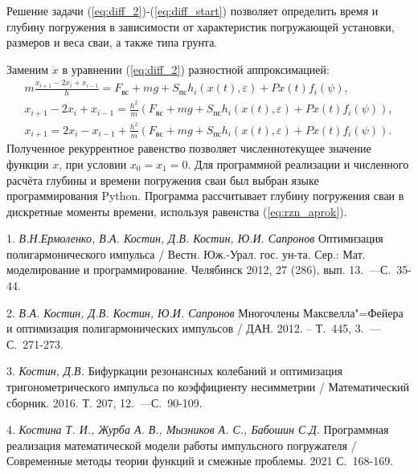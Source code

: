 Решение задачи (\ref{eq:diff_2})-(\ref{eq:diff_start}) позволяет определить время и глубину погружения в зависимости от характеристик погружающей установки, размеров и веса сваи, а также типа грунта.

Заменим $\ddot{x}$ в уравнении (\ref{eq:diff_2}) разностной аппроксимацией:
\begin{equation}\label{eq:rzn_aprok}
    \begin{gathered}
        m \frac{x_{i+1}\!-\!2x_i\!+\!x_{i-1}}{h}\! = \!F_{\textrm{вс}}\!+\!mg\!+\!S_{\textrm{пс}}h_i(x(t),\varepsilon)\!+\!Px(t)f_i(\psi), \\
        x_{i+1} - 2x_i + x_{i-1}\! = \!\frac{h^2}{m}(F_{\textrm{вс}}\!+\!mg\!+\!S_{\textrm{пс}}h_i(x(t),\varepsilon)\!+\!Px(t)f_i(\psi)), \\
        x_{i+1}\! = \!2x_i\!-\!x_{i-1}\!+\!\frac{h^2}{m}(F_{\textrm{вс}}\!+\!mg\!+\!S_{\textrm{пс}}h_i(x(t),\varepsilon)\!+\!Px(t)f_i(\psi)).
    \end{gathered}
\end{equation}
Полученное рекуррентное равенство позволяет численно текущее значение функции $x$, при условии $x_0 = x_1 = 0$.
Для программной реализации и численного расчёта глубины и времени погружения сваи был выбран языке программирования Python. Программа рассчитывает глубину погружения сваи в дискретные моменты времени, используя равенства (\ref{eq:rzn_aprok}).


\litlist

1. {\it В.Н.Ермоленко, В.А. Костин, Д.В. Костин, Ю.И. Сапронов}
Оптимизация полигармонического импульса / Вестн. Юж.-Урал. гос. ун-та. Сер.: Мат. моделирование и программирование. Челябинск 2012, 27 (286), вып. 13.~---С.~35-44.

2. {\it В.А. Костин, Д.В. Костин, Ю.И. Сапронов}
Многочлены Максвелла"=Фейера и оптимизация полигармонических импульсов / ДАН. 2012. -- Т.~445, 3.~---С.~271-273.

3. {\it Костин, Д.В.}
Бифуркации резонансных колебаний и оптимизация тригонометрического импульса по коэффициенту несимметрии / Математический сборник. 2016. Т. 207, 12.~---С.~90-109.

4. {\it Костина Т. И., Журба А. В., Мызников А. С., Бабошин С.Д.}
Программная реализация математической модели работы импульсного погружателя / Современные методы теории функций и смежные проблемы. 2021 С.~168-169.
